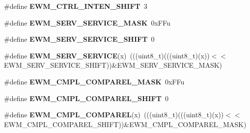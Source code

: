 \begin{DoxyCompactItemize}
\item 
\#define {\bfseries E\+W\+M\+\_\+\+C\+T\+R\+L\+\_\+\+I\+N\+T\+E\+N\+\_\+\+S\+H\+I\+FT}~3\hypertarget{group__EWM__Register__Masks_gae89666da54b9dba35d0ac6e74542413d}{}\label{group__EWM__Register__Masks_gae89666da54b9dba35d0ac6e74542413d}

\item 
\#define {\bfseries E\+W\+M\+\_\+\+S\+E\+R\+V\+\_\+\+S\+E\+R\+V\+I\+C\+E\+\_\+\+M\+A\+SK}~0x\+F\+Fu\hypertarget{group__EWM__Register__Masks_ga45e5d6d64deeb807800e044bb82f318f}{}\label{group__EWM__Register__Masks_ga45e5d6d64deeb807800e044bb82f318f}

\item 
\#define {\bfseries E\+W\+M\+\_\+\+S\+E\+R\+V\+\_\+\+S\+E\+R\+V\+I\+C\+E\+\_\+\+S\+H\+I\+FT}~0\hypertarget{group__EWM__Register__Masks_ga4aacdb92f0d1a2edcdf651328e741c6a}{}\label{group__EWM__Register__Masks_ga4aacdb92f0d1a2edcdf651328e741c6a}

\item 
\#define {\bfseries E\+W\+M\+\_\+\+S\+E\+R\+V\+\_\+\+S\+E\+R\+V\+I\+CE}(x)~(((uint8\+\_\+t)(((uint8\+\_\+t)(x))$<$$<$E\+W\+M\+\_\+\+S\+E\+R\+V\+\_\+\+S\+E\+R\+V\+I\+C\+E\+\_\+\+S\+H\+I\+FT))\&E\+W\+M\+\_\+\+S\+E\+R\+V\+\_\+\+S\+E\+R\+V\+I\+C\+E\+\_\+\+M\+A\+SK)\hypertarget{group__EWM__Register__Masks_gae68020a38e5cb5c1b85060cdfcaad1ef}{}\label{group__EWM__Register__Masks_gae68020a38e5cb5c1b85060cdfcaad1ef}

\item 
\#define {\bfseries E\+W\+M\+\_\+\+C\+M\+P\+L\+\_\+\+C\+O\+M\+P\+A\+R\+E\+L\+\_\+\+M\+A\+SK}~0x\+F\+Fu\hypertarget{group__EWM__Register__Masks_gaed4764277fd6da7338abe074b6ca509e}{}\label{group__EWM__Register__Masks_gaed4764277fd6da7338abe074b6ca509e}

\item 
\#define {\bfseries E\+W\+M\+\_\+\+C\+M\+P\+L\+\_\+\+C\+O\+M\+P\+A\+R\+E\+L\+\_\+\+S\+H\+I\+FT}~0\hypertarget{group__EWM__Register__Masks_ga34ba2acd3dfb6ac825d6ca812b4461fd}{}\label{group__EWM__Register__Masks_ga34ba2acd3dfb6ac825d6ca812b4461fd}

\item 
\#define {\bfseries E\+W\+M\+\_\+\+C\+M\+P\+L\+\_\+\+C\+O\+M\+P\+A\+R\+EL}(x)~(((uint8\+\_\+t)(((uint8\+\_\+t)(x))$<$$<$E\+W\+M\+\_\+\+C\+M\+P\+L\+\_\+\+C\+O\+M\+P\+A\+R\+E\+L\+\_\+\+S\+H\+I\+FT))\&E\+W\+M\+\_\+\+C\+M\+P\+L\+\_\+\+C\+O\+M\+P\+A\+R\+E\+L\+\_\+\+M\+A\+SK)\hypertarget{group__EWM__Register__Masks_gab21f922dd31c0389d2431b0bad15c34a}{}\label{group__EWM__Register__Masks_gab21f922dd31c0389d2431b0bad15c34a}


\end{DoxyCompactItemize}
